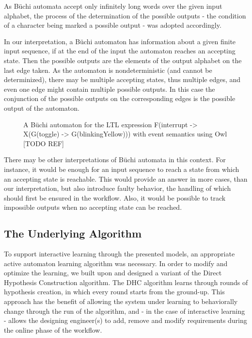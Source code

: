 As Büchi automata accept only infinitely long words over the given input alphabet, the process of the determination of the possible outputs - the condition of a character being marked a possible output - was adopted accordingly.

In our interpretation, a Büchi automaton has information about a given finite input sequence, if at the end of the input the automaton reaches an accepting state. Then the possible outputs are the elements of the output alphabet on the last edge taken. As the automaton is nondeterministic (and cannot be determinized), there may be multiple accepting states, thus multiple edges, and even one edge might contain multiple possible outputs. In this case the conjunction of the possible outputs on the corresponding edges is the possible output of the automaton.  

\begin{figure}[!ht] 
	\centering
	\caption{A Büchi automaton for the LTL expression F(interrupt -> X(G(toggle) -> G(blinkingYellow))) with event semantics using Owl [TODO REF]} 
	\label{fig_architecture_buchiexample}
\end{figure} %

There may be other interpretations of Büchi automata in this context. For instance, it would be enough for an input sequence to reach a state from which an accepting state is reachable. This would provide an answer in more cases, than our interpretation, but also introduce faulty behavior, the handling of which should first be ensured in the workflow. Also, it would be possible to track impossible outputs when no accepting state can be reached.

\subsection{The Underlying Algorithm} \label{subs_dhcintheframework}
To support interactive learning through the presented models, an appropriate active automaton learning algorithm was necessary. In order to modify and optimize the learning, we built upon and designed a variant of the Direct Hypothesis Construction algorithm. The DHC algorithm learns through rounds of hypothesis creation, in which every round starts from the ground-up. This approach has the benefit of allowing the system under learning to behaviorally change through the run of the algorithm, and - in the case of interactive learning - allows the designing engineer(s) to add, remove and modify requirements during the online phase of the workflow.

